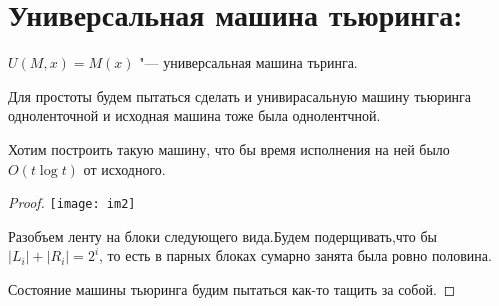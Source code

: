 \section{Универсальная машина тьюринга:}
\begin{Def}
$U(M, x) = M(x)$ "--- универсальная машина тьринга.
\end{Def}

Для простоты будем пытаться сделать и унивирасальную машину тьюринга одноленточной и исходная 
машина тоже была однолентчной. 

\begin{theorem}
Хотим построить такую машину, что бы время исполнения на ней было $O(t \log t)$ от исходного. 
\end{theorem}

\begin{proof}
\texttt{[image: im2]}

Разобъем ленту на блоки следующего вида.Будем подерщивать,что бы $|L_i| + |R_i| = 2^i$, 
то есть в парных блоках сумарно занята была ровно половина. 

Состояние машины тьюринга будим пытаться как-то тащить за собой. 
\end{proof}
